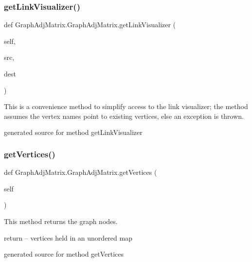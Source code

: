 \subsubsection{\texorpdfstring{get\+Link\+Visualizer()}{getLinkVisualizer()}}
{\footnotesize\ttfamily def Graph\+Adj\+Matrix.\+Graph\+Adj\+Matrix.\+get\+Link\+Visualizer (\begin{DoxyParamCaption}\item[{}]{self,  }\item[{}]{src,  }\item[{}]{dest }\end{DoxyParamCaption})}



This is a convenience method to simplify access to the link visualizer; the method assumes the vertex names point to existing vertices, else an exception is thrown. 

\begin{DoxyVerb}generated source for method getLinkVisualizer \end{DoxyVerb}
 \hypertarget{class_graph_adj_matrix_1_1_graph_adj_matrix_aa3fbe3365150b94bdd232788defe7739}{}\label{class_graph_adj_matrix_1_1_graph_adj_matrix_aa3fbe3365150b94bdd232788defe7739} 
\subsubsection{\texorpdfstring{get\+Vertices()}{getVertices()}}
{\footnotesize\ttfamily def Graph\+Adj\+Matrix.\+Graph\+Adj\+Matrix.\+get\+Vertices (\begin{DoxyParamCaption}\item[{}]{self }\end{DoxyParamCaption})}



This method returns the graph nodes. 

return -- vertices held in an unordered map\begin{DoxyVerb}generated source for method getVertices \end{DoxyVerb}
 \hypertarget{class_graph_adj_matrix_1_1_graph_adj_matrix_a17a86c39cd089c4a7379a47ffcff3390}{}\label{class_graph_adj_matrix_1_1_graph_adj_matrix_a17a86c39cd089c4a7379a47ffcff3390} 
